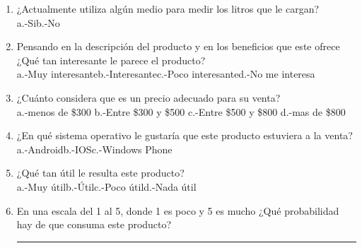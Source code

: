 \begin{enumerate}
	\item ¿Actualmente utiliza algún medio para medir los litros que le cargan?\\ a.-Si\hspace{1cm}b.-No
	\item Pensando en la descripción del producto y en los beneficios que este ofrece ¿Qué tan interesante le parece el producto?
	\\ a.-Muy interesante\hspace{1cm}b.-Interesante\hspace{1cm}c.-Poco interesante\hspace{1cm}d.-No me interesa
	\item ¿Cuánto considera que es un precio adecuado para su venta?
	\\ a.-menos de \$300 \hspace{1cm}b.-Entre \$300 y \$500 \hspace{1cm}c.-Entre \$500 y \$800 \hspace{1cm}d.-mas de \$800
	\item ¿En qué sistema operativo le gustaría que este producto estuviera a la venta?\\ a.-Android\hspace{1cm}b.-IOS\hspace{1cm}c.-Windows Phone
	\item ¿Qué tan útil le resulta este producto?\\ a.-Muy útil\hspace{1cm}b.-Útil\hspace{1cm}c.-Poco útil\hspace{1cm}d.-Nada útil
	\item En una escala del 1 al 5, donde 1 es poco y 5 es mucho ¿Qué probabilidad hay de que consuma este producto?\rule{20mm}{0.1mm}
\end{enumerate}